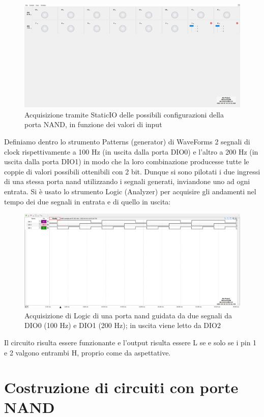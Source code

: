 \documentclass[10pt, a4paper, italian]{article}
\begin{document}
\begin{figure}[htbp]
	\includegraphics[scale=0.21]{static_nand11}
	\caption{Acquisizione tramite StaticIO delle possibili configurazioni della porta NAND, in funzione dei valori di input}
\end{figure}
Definiamo dentro lo strumento Patterns (generator) di WaveForms 2 segnali
di clock rispettivamente a 100 Hz (in uscita dalla porta DIO0) e l'altro a 200 Hz (in uscita dalla porta DIO1) in modo che la loro combinazione producesse tutte le coppie di valori possibili ottenibili con 2 bit.
Dunque si sono pilotati i due ingressi di una stessa porta nand utilizzando i segnali generati, inviandone uno ad ogni entrata.
Si è usato lo strumento Logic (Analyzer) per acquisire gli andamenti nel tempo dei due segnali in entrata e di quello in uscita:
\begin{figure}[htbp]
\centering
	\includegraphics[scale=0.4]{nand_time}
	\caption{\label{nand_time}Acquisizione di Logic di una porta nand guidata da due segnali da
	DIO0 (100 Hz) e DIO1 (200 Hz); in uscita viene letto da DIO2}
	
\end{figure}
Il circuito risulta essere funzionante e l'output risulta essere L se e solo
se i pin 1 e 2 valgono entrambi H, proprio come da aspettative.

\section{Costruzione di circuiti con porte NAND}
\end{document}
